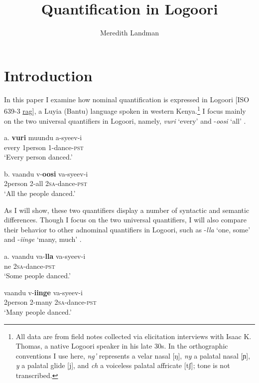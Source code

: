 \documentclass[output=paper]{langsci/langscibook}
\title{Quantification in Logoori}
\author{%
 Meredith Landman \affiliation{Pomona College} 
}
\begin{document}
 
 

\section{Introduction}

In this paper I examine how nominal quantification is expressed in Logoori [ISO 639-3 \href{http://www-01.sil.org/iso639-3/documentation.asp?id=rag}{rag}], a Luyia (Bantu) language spoken in western Kenya.\footnote{ All data are from field notes collected via elicitation interviews with Isaac K. Thomas, a native Logoori speaker in his late 30s. In the orthographic conventions I use here, \textit{ng'} represents a velar nasal [ŋ], \textit{ny} a palatal nasal [ɲ], \textit{y} a palatal glide [j], and \textit{ch} a voiceless palatal affricate [tʃ]; tone is not transcribed.
} I focus mainly on the two universal quantifiers in Logoori, namely, \textit{vuri} ‘every’  and -\textit{oosi} ‘all’ .

\ea
\gll \textup{a.}  \textbf{vuri}  muundu  a-syeev-i\\
     every  1person  1-dance-\textsc{pst}\\
\glt ‘Every person danced.’
\z

\ea
\gll \textup{b.}   vaandu  v-\textbf{oosi}    va-syeev-i\\
     2person  2-all    2\textsc{sa}{}-dance-\textsc{pst}\\
\glt ‘All the people danced.’
\z

As I will show, these two quantifiers display a number of syntactic and semantic differences. Though I focus on the two universal quantifiers, I will also compare their behavior to other adnominal quantifiers in Logoori, such as -\textit{lla} ‘one, some’  and -\textit{iinge} ‘many, much’ .


\ea
\gll \textup{   a.}   vaandu  va-\textbf{lla}    va-syeev-i\\
ne    2\textsc{sa}{}-dance-\textsc{pst}\\
\glt ‘Some people danced.’
\z

\ea
 \gll vaandu  v-\textbf{iinge}  va-syeev-i\\
     2person  2-many  2\textsc{sa}{}-dance-\textsc{pst}\\
\glt ‘Many people danced.’\\
\z
\end{document}
